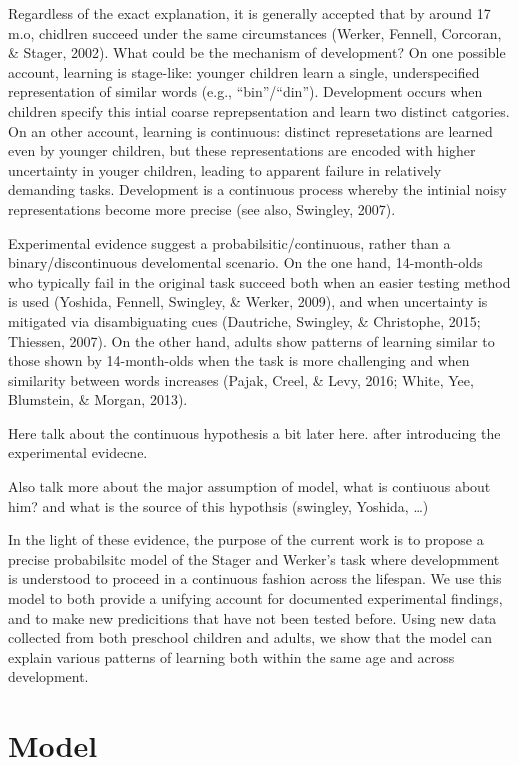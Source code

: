 \documentclass[10pt, letterpaper]{article}
\begin{document}
Regardless of the exact explanation, it is generally accepted that by
around 17 m.o, chidlren succeed under the same circumstances (Werker,
Fennell, Corcoran, \& Stager, 2002). What could be the mechanism of
development? On one possible account, learning is stage-like: younger
children learn a single, underspecified representation of similar words
(e.g., ``bin''/``din''). Development occurs when children specify this
intial coarse reprepsentation and learn two distinct catgories. On an
other account, learning is continuous: distinct represetations are
learned even by younger children, but these representations are encoded
with higher uncertainty in youger children, leading to apparent failure
in relatively demanding tasks. Development is a continuous process
whereby the intinial noisy representations become more precise (see
also, Swingley, 2007).

Experimental evidence suggest a probabilsitic/continuous, rather than a
binary/discontinuous develomental scenario. On the one hand,
14-month-olds who typically fail in the original task succeed both when
an easier testing method is used (Yoshida, Fennell, Swingley, \& Werker,
2009), and when uncertainty is mitigated via disambiguating cues
(Dautriche, Swingley, \& Christophe, 2015; Thiessen, 2007). On the other
hand, adults show patterns of learning similar to those shown by
14-month-olds when the task is more challenging and when similarity
between words increases (Pajak, Creel, \& Levy, 2016; White, Yee,
Blumstein, \& Morgan, 2013).

Here talk about the continuous hypothesis a bit later here. after
introducing the experimental evidecne.

Also talk more about the major assumption of model, what is contiuous
about him? and what is the source of this hypothsis (swingley, Yoshida,
\ldots{})

In the light of these evidence, the purpose of the current work is to
propose a precise probabilsitc model of the Stager and Werker's task
where developmment is understood to proceed in a continuous fashion
across the lifespan. We use this model to both provide a unifying
account for documented experimental findings, and to make new
predicitions that have not been tested before. Using new data collected
from both preschool children and adults, we show that the model can
explain various patterns of learning both within the same age and across
development.

\section{Model}\label{model}
\end{document}
